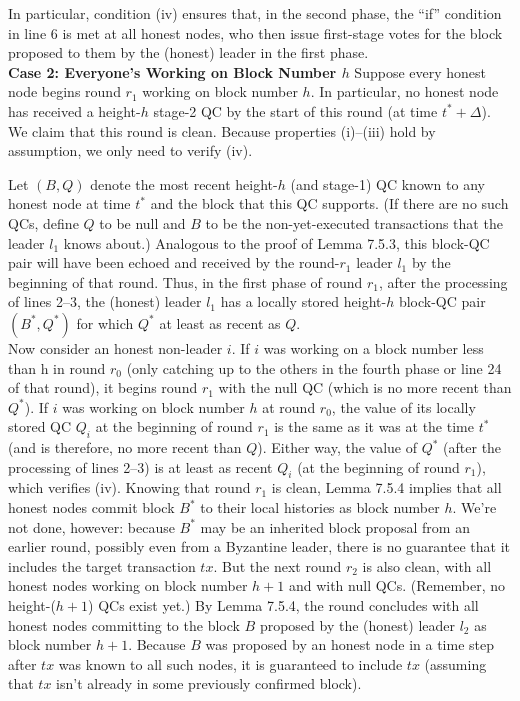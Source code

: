 In particular, condition (iv) ensures that, in the second phase, the “if” condition in line 6 is
met at all honest nodes, who then issue first-stage votes for the block proposed to them by
the (honest) leader in the first phase.\\

\noindent
\textbf{Case 2: Everyone’s Working on Block Number $h$}
Suppose every honest node begins round $r_1$ working on block number $h$. In particular, no
honest node has received a height-$h$ stage-2 QC by the start of this round (at time $t^* + \Delta$).
We claim that this round is clean. Because properties (i)–(iii) hold by assumption, we only
need to verify (iv).

Let $(B, Q)$ denote the most recent height-$h$ (and stage-1) QC known to any honest node
at time $t^*$ and the block that this QC supports. (If there are no such QCs, define $Q$ to be null
and $B$ to be the non-yet-executed transactions that the leader $l_1$ knows about.) Analogous
to the proof of Lemma 7.5.3, this block-QC pair will have been echoed and received by the
round-$r_1$ leader $l_1$ by the beginning of that round. Thus, in the first phase of round $r_1$, after
the processing of lines 2–3, the (honest) leader $l_1$ has a locally stored height-$h$ block-QC
pair $(B^*, Q^*)$ for which $Q^*$ at least as recent as $Q$.\\
Now consider an honest non-leader $i$.
If $i$ was working on a block number less than h in round $r_0$ (only catching up to the others
in the fourth phase or line 24 of that round), it begins round $r_1$ with the null QC (which
is no more recent than $Q^*$). If $i$ was working on block number $h$ at round $r_0$, the value of
its locally stored QC $Q_i$ at the beginning of round $r_1$ is the same as it was at the time $t^*$ (and
is therefore, no more recent than $Q$). Either way, the value of $Q^*$
(after the processing of
lines 2–3) is at least as recent $Q_i$ (at the beginning of round $r_1$), which verifies (iv).
Knowing that round $r_1$ is clean, Lemma 7.5.4 implies that all honest nodes commit block $B^*$
to their local histories as block number $h$. We’re not done, however: because $B^*$ may be an
inherited block proposal from an earlier round, possibly even from a Byzantine leader, there
is no guarantee that it includes the target transaction $tx$.
But the next round $r_2$ is also clean, with all honest nodes working on block number $h + 1$
and with null QCs. (Remember, no height-($h + 1$) QCs exist yet.) By Lemma 7.5.4, the
round concludes with all honest nodes committing to the block $B$ proposed by the (honest)
leader $l_2$ as block number $h + 1$. Because $B$ was proposed by an honest node in a time step
after $tx$ was known to all such nodes, it is guaranteed to include $tx$ (assuming that $tx$ isn’t
already in some previously confirmed block).\\

